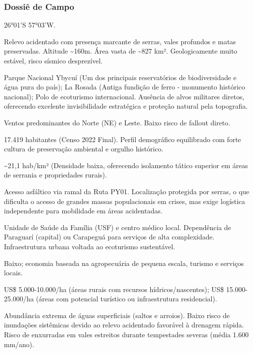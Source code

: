 \subsubsection{Dossiê de Campo}
\begin{description}[style=nextline,leftmargin=0.5cm,font=\bfseries]
\item[Coordenadas]  26°01'S 57°03'W.
\item[Topografia]  Relevo acidentado com presença marcante de serras, vales profundos e matas preservadas. Altitude \textasciitilde 160m. Área vasta de \textasciitilde 827 km². Geologicamente muito estável, risco sísmico desprezível.
\item[Alvos Estratégicos]  Parque Nacional Ybycuí (Um dos principais reservatórios de biodiversidade e água pura do país); La Rosada (Antiga fundição de ferro - monumento histórico nacional); Polo de ecoturismo internacional. Ausência de alvos militares diretos, oferecendo excelente invisibilidade estratégica e proteção natural pela topografia.
\item[Fallout]  Ventos predominantes do Norte (NE) e Leste. Baixo risco de fallout direto.
\item[População]  17.419 habitantes (Censo 2022 Final). Perfil demográfico equilibrado com forte cultura de preservação ambiental e orgulho histórico.
\item[Densidade]  \textasciitilde 21,1 hab/\allowbreak km² (Densidade baixa, oferecendo isolamento tático superior em áreas de serrania e propriedades rurais).
\item[Vias de Acesso]  Acesso asfáltico via ramal da Ruta PY01. Localização protegida por serras, o que dificulta o acesso de grandes massas populacionais em crises, mas exige logística independente para mobilidade em áreas acidentadas.
\item[Serviços]  Unidade de Saúde da Família (USF) e centro médico local. Dependência de Paraguarí (capital) ou Carapeguá para serviços de alta complexidade. Infraestrutura urbana voltada ao ecoturismo sustentável.
\item[Custo de Vida]  Baixo; economia baseada na agropecuária de pequena escala, turismo e serviços locais.
\item[Preço da Terra]  US\$ 5.000-10.000/\allowbreak ha (áreas rurais com recursos hídricos/\allowbreak nascentes); US\$ 15.000-25.000/\allowbreak ha (áreas com potencial turístico ou infraestrutura residencial).
\item[Hidrologia]  Abundância extrema de águas superficiais (saltos e arroios). Baixo risco de inundações sistêmicas devido ao relevo acidentado favorável à drenagem rápida. Risco de enxurradas em vales estreitos durante tempestades severas (média 1.600 mm/\allowbreak ano).

\end{description}
